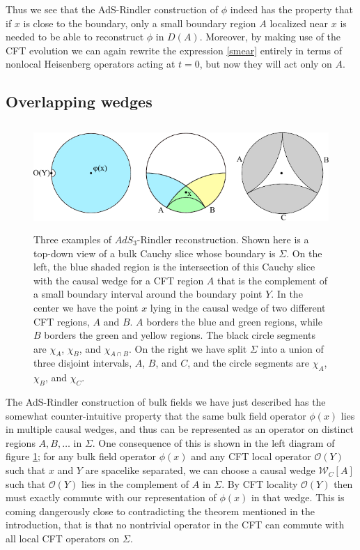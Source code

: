 \documentclass[11pt]{article}
\newcommand{\mO}{\mathcal{O}}
\newcommand{\W}{\mathcal{W}}
\begin{document}
Thus we see that the AdS-Rindler construction of $\phi$ indeed has the property that if $x$ is close to the boundary, only a small boundary region $A$ localized near $x$ is needed to be able to reconstruct $\phi$ in $D(A)$.  Moreover, by making use of the CFT evolution we can again rewrite the expression \eqref{smear} entirely in terms of nonlocal Heisenberg operators acting at $t=0$, but now they will act only on $A$.  

\subsection{Overlapping wedges}
\begin{figure}
\begin{center}
\includegraphics[height=4cm]{paradox1.pdf}
\caption{Three examples of $AdS_3$-Rindler reconstruction.  Shown here is a top-down view of a bulk Cauchy slice whose boundary is $\Sigma$.  On the left, the blue shaded region is the intersection of this Cauchy slice with the causal wedge for a CFT region $A$ that is the complement of a small boundary interval around the boundary point $Y$.  In the center we have the point $x$ lying in the causal wedge of two different CFT regions, $A$ and $B$.  $A$ borders the blue and green regions, while $B$ borders the green and yellow regions. The black circle segments are $\chi_A$, $\chi_B$, and $\chi_{A\cap B}$.  On the right we have split $\Sigma$ into a union of three disjoint intervals, $A$, $B$, and $C$, and the circle segments are $\chi_A$, $\chi_B$, and $\chi_C$.}\label{paradox1fig}
\end{center}
\end{figure}
The AdS-Rindler construction of bulk fields we have just described has the somewhat counter-intuitive property that the same bulk field operator $\phi(x)$ lies in multiple causal wedges, and thus can be represented as an operator on distinct regions $A,B,\ldots$ in $\Sigma$.  One consequence of this is shown in the left diagram of figure \ref{paradox1fig}; for any bulk field operator $\phi(x)$ and any CFT local operator $\mO(Y)$ such that $x$ and $Y$ are spacelike separated, we can choose a causal wedge $\W_C[A]$ such that $\mO(Y)$ lies in the complement of $A$ in $\Sigma$.  By CFT locality $\mO(Y)$ then must exactly commute with our representation of $\phi(x)$ in that wedge.  This is coming dangerously close to contradicting the theorem mentioned in the introduction, that is that no nontrivial operator in the CFT can commute with all local CFT operators on $\Sigma$.  
\end{document}
